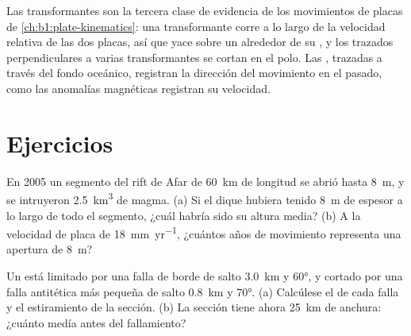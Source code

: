 \begin{omfigure}
\par{}
\label{fig:b1:rifts-ridges-margins:transform}
\end{omfigure}

Las transformantes son la tercera clase de evidencia de los movimientos de placas de \cref{ch:b1:plate-kinematics}: una transformante corre
a lo largo de la velocidad relativa de las dos placas, así que yace sobre un  alrededor de su , y los  trazados perpendiculares a varias transformantes se cortan en el polo. Las , trazadas a través del fondo oceánico,
registran la dirección del movimiento en el pasado, como las anomalías magnéticas registran su velocidad.

\section{Ejercicios}

\begin{exercise}[$\star$]\label{exo:b1:rifts-ridges-margins:1}
En 2005 un segmento del rift de Afar de \qty{60}{km} de longitud se abrió hasta \qty{8}{m}, y se intruyeron \qty{2.5}{km^3} de magma. (a) Si el
dique hubiera tenido \qty{8}{m} de espesor a lo largo de todo el segmento, ¿cuál habría sido su altura media? (b) A la velocidad de placa de
\qty{18}{mm.yr^{-1}}, ¿cuántos años de movimiento representa una apertura de \qty{8}{m}?
\end{exercise}

\begin{exercise}[$\star$]\label{exo:b1:rifts-ridges-margins:2}
Un  está limitado por una falla de borde de salto \qty{3.0}{km} y  \ang{60}, y cortado por una falla antitética más pequeña
de salto \qty{0.8}{km} y  \ang{70}. (a) Calcúlese el  de cada falla y el estiramiento de la sección. (b) La sección
tiene ahora \qty{25}{km} de anchura: ¿cuánto medía antes del fallamiento?
\end{exercise}

